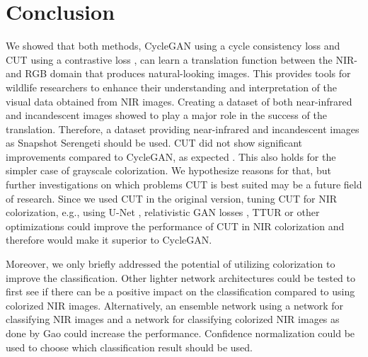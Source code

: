 \documentclass[a4paper,11pt, DIV=12]{scrartcl}
\begin{document}
\section{Conclusion}
We showed that both methods, CycleGAN using a cycle consistency loss \cite{mehri2019colorizing} and CUT using a contrastive loss \cite{cut}, can learn a translation function between the NIR- and RGB domain that produces natural-looking images.
This provides tools for wildlife researchers to enhance their understanding and interpretation of the visual data obtained from NIR images.
Creating a dataset of both near-infrared and incandescent images showed to play a major role in the success of the translation.
Therefore, a dataset providing near-infrared and incandescent images as Snapshot Serengeti \cite{serengeti} should be used.
CUT did not show significant improvements compared to CycleGAN, as expected \cite{cut}.
This also holds for the simpler case of grayscale colorization.
We hypothesize reasons for that, but further investigations on which problems CUT is best suited may be a future field of research.
Since we used CUT in the original version, tuning CUT for NIR colorization, e.g., using U-Net \cite{unet}, relativistic GAN losses \cite{rel_gan}, TTUR \cite{ttur} or other optimizations
could improve the performance of CUT in NIR colorization and therefore would make it superior to CycleGAN.

Moreover, we only briefly addressed the potential of utilizing colorization to improve the classification.
Other lighter network architectures could be tested to first see if there can be a positive impact on the classification compared to using colorized NIR images.
Alternatively, an ensemble network using a network for classifying NIR images and a network for classifying colorized NIR images as done by Gao  \cite{cyclegan_camera_traps} could increase the performance.
Confidence normalization \cite{guo2017calibration} could be used to choose which classification result should be used.

\printbibliography
\end{document}
